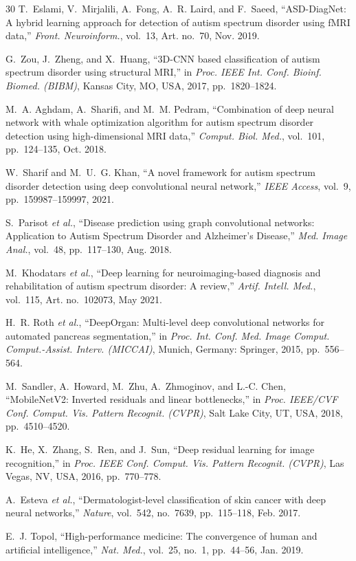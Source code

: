 \documentclass[conference]{IEEEtran}
\begin{document}
\begin{thebibliography}{30}
T.~Eslami, V.~Mirjalili, A.~Fong, A.~R. Laird, and F.~Saeed, ``ASD-DiagNet: A hybrid learning approach for detection of autism spectrum disorder using fMRI data,'' \emph{Front. Neuroinform.}, vol.~13, Art. no.~70, Nov. 2019.

G.~Zou, J.~Zheng, and X.~Huang, ``3D-CNN based classification of autism spectrum disorder using structural MRI,'' in \emph{Proc. IEEE Int. Conf. Bioinf. Biomed. (BIBM)}, Kansas City, MO, USA, 2017, pp.~1820--1824.

M.~A. Aghdam, A.~Sharifi, and M.~M. Pedram, ``Combination of deep neural network with whale optimization algorithm for autism spectrum disorder detection using high-dimensional MRI data,'' \emph{Comput. Biol. Med.}, vol.~101, pp.~124--135, Oct. 2018.

W.~Sharif and M.~U.~G. Khan, ``A novel framework for autism spectrum disorder detection using deep convolutional neural network,'' \emph{IEEE Access}, vol.~9, pp.~159987--159997, 2021.

S.~Parisot \emph{et al.}, ``Disease prediction using graph convolutional networks: Application to Autism Spectrum Disorder and Alzheimer's Disease,'' \emph{Med. Image Anal.}, vol.~48, pp.~117--130, Aug. 2018.

M.~Khodatars \emph{et al.}, ``Deep learning for neuroimaging-based diagnosis and rehabilitation of autism spectrum disorder: A review,'' \emph{Artif. Intell. Med.}, vol.~115, Art. no.~102073, May 2021.

H.~R. Roth \emph{et al.}, ``DeepOrgan: Multi-level deep convolutional networks for automated pancreas segmentation,'' in \emph{Proc. Int. Conf. Med. Image Comput. Comput.-Assist. Interv. (MICCAI)}, Munich, Germany: Springer, 2015, pp.~556--564.

M.~Sandler, A.~Howard, M.~Zhu, A.~Zhmoginov, and L.-C. Chen, ``MobileNetV2: Inverted residuals and linear bottlenecks,'' in \emph{Proc. IEEE/CVF Conf. Comput. Vis. Pattern Recognit. (CVPR)}, Salt Lake City, UT, USA, 2018, pp.~4510--4520.

K.~He, X.~Zhang, S.~Ren, and J.~Sun, ``Deep residual learning for image recognition,'' in \emph{Proc. IEEE Conf. Comput. Vis. Pattern Recognit. (CVPR)}, Las Vegas, NV, USA, 2016, pp.~770--778.

A.~Esteva \emph{et al.}, ``Dermatologist-level classification of skin cancer with deep neural networks,'' \emph{Nature}, vol.~542, no.~7639, pp.~115--118, Feb. 2017.

E.~J. Topol, ``High-performance medicine: The convergence of human and artificial intelligence,'' \emph{Nat. Med.}, vol.~25, no.~1, pp.~44--56, Jan. 2019.

\end{thebibliography}
\end{document}
